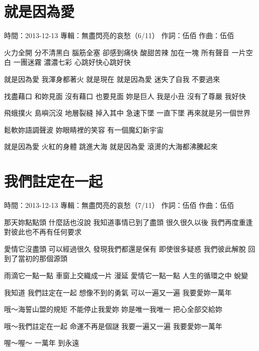 \documentclass[UTF8,a4paper,oneside,twocolumn,12pt]{ctexbook}
\newcommand{\infopair}[2]{\textbullet #1：#2}
\newcommand{\zc}[1][伍佰]{\infopair{作詞}{#1}}
\newcommand{\zq}[1][伍佰]{\infopair{作曲}{#1}}
\newcommand{\zj}[1]{\infopair{專輯}{#1}}
\newcommand{\sj}[1]{\infopair{時間}{#1}}
\newenvironment{info}{\begin{flushleft}\kaishu
	}
	{\end{flushleft}\normalsize\yahei\par}
\newenvironment{lyric}{
	}
{}
\begin{document}
\section{就是因為愛}
\begin{info}
	\sj{2013-12-13}
	\zj{無盡閃亮的哀愁（6/11）}
	\zc
	\zq
\end{info}
\begin{lyric}
	火力全開 分不清黑白
	腦筋全塞 卻感到痛快
	酸甜苦辣 加在一塊
	所有聲音 一片空白
	一團迷霧 濃濃七彩
	心跳好快心跳好快

	就是因為愛
	我渾身都著火 就是現在
	就是因為愛
	迷失了自我 不要過來

	找盡藉口 和妳見面
	沒有藉口 也要見面
	妳是巨人 我是小丑
	沒有了尊嚴 我好快

	飛蛾撲火 島嶼沉沒
	地層裂縫 掉入其中
	急速下墜 一直下墜
	再來就是另一個世界

	鬆軟妳語調聲波
	妳眼睛裡的笑容
	有一個魔幻新宇宙

	就是因為愛
	火紅的身體 跳進大海
	就是因為愛
	滾燙的大海都沸騰起來
\end{lyric}

\section{我們註定在一起}
\begin{info}
	\sj{2013-12-13}
	\zj{無盡閃亮的哀愁（7/11）}
	\zc
	\zq
\end{info}
\begin{lyric}
	那天妳點點頭 什麼話也沒說
	我知道事情已到了盡頭
	很久很久以後 我們再度重逢
	對彼此也不再有任何要求

	愛情它沒盡頭 可以經過很久
	發現我們都還是保有
	即使很多疑惑 我們彼此解脫
	回到了當初的那個源頭

	雨滴它一點一點 車窗上交織成一片 漫延
	愛情它一點一點 人生的循環之中 蛻變

	我知道
	我們註定在一起 想像不到的勇氣
	可以一遍又一遍 我要愛妳一萬年

	哦～海誓山盟的規矩 不能停止我愛妳
	妳是唯一我唯一 把心全部交給妳

	哦～我們註定在一起 命運不再是個謎
	我要一遍又一遍 我要愛妳一萬年

	喔～喔～
	一萬年
	到永遠
\end{lyric}
\end{document}
